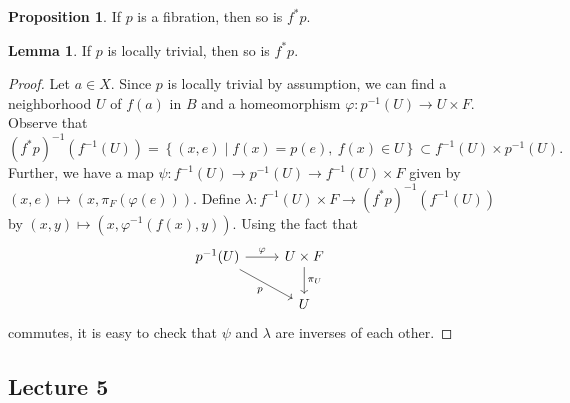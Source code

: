 \documentclass[10pt,letterpaper,cm]{nupset}
\theoremstyle{definition}
\theoremstyle{theorem}
\newtheorem{lemma}[defn]{Lemma}
\newtheorem{prop}[defn]{Proposition}
\theoremstyle{remark}
\newcommand{\1}{\mathbb{1}}
\newcommand{\0}{\vec 0}
\begin{document}
\begin{prop}
If $p$ is a fibration, then so is $f^{\ast}{p}$.
\end{prop}

\begin{lemma}\label{pbtriv}
If $p$ is locally trivial, then so is $f^{\ast}{p}$. 
\end{lemma}
\begin{proof}
Let $a \in X$. Since $p$ is locally trivial by assumption, we can find a neighborhood $U$ of $f(a)$ in $B$ and a homeomorphism $\varphi : p^{-1}(U) \to U \times F$. Observe that 
\[
(f^{\ast}{p})^{-1}(f^{-1}(U)) = \left\{\left(x,e\right) \mid f(x) = p(e), \ f(x) \in U\right\} \subset f^{-1}(U) \times p^{-1}(U).
\] Further, we have a map $\psi : f^{-1}(U) \to p^{-1}(U) \to f^{-1}(U) \times F$ given by $\left(x,e\right) \mapsto \left(x, \pi_F(\varphi(e))\right)$. Define $\lambda : f^{-1}(U) \times F \to (f^{\ast}{p})^{-1}(f^{-1}(U))$ by $\left(x,y\right) \mapsto \left(x, \varphi^{-1}(f(x), y)\right)$. Using the fact that 
\[
\begin{tikzcd}
p^{-1}(U) \arrow[r, "\varphi"] \arrow[rd, "p"'] & U\times F \arrow[d, "\pi_U"] \\
                                                    & U                           
\end{tikzcd}
\] commutes, it is easy to check that $\psi$ and $\lambda$ are inverses of each other. 
\end{proof}



\subsection{Lecture 5}
\end{document}

